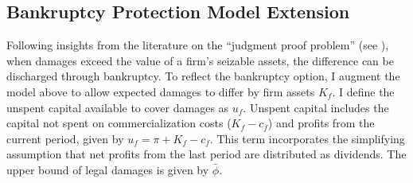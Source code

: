 \documentclass[letterpaper,12pt]{article}
\theoremstyle{definition}
\begin{document}
\subsection{Bankruptcy Protection Model Extension}\label{sec:bankruptcy}


Following insights from the literature on the ``judgment proof problem'' (see \citealp{shavell1986judgment,boomhower2019drilling}), when damages exceed the value of a firm's seizable assets, the difference can be discharged through bankruptcy. To reflect the bankruptcy option, I augment the model above to allow expected damages to differ by firm assets $K_f$. I define the unspent capital available to cover damages as $u_f$. Unspent capital includes the capital not spent on commercialization costs ($K_f - c_f$) and profits from the current period, given by $u_f = \pi + K_f - c_f$. This term incorporates the simplifying assumption that net profits from the last period are distributed as dividends.\footnotemark {} The upper bound of legal damages is given by $\bar{\phi}$.
\end{document}
